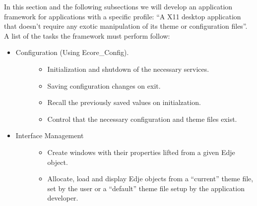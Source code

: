 \documentclass[12pt,a4paper,english]{book}
\begin{document}
In this section and the following subsections we will develop an application
framework for applications with a specific profile: ``A X11 desktop application
that doesn't require any exotic manipulation of its theme or configuration
files''. A list of the tasks the framework must perform follow:
\begin{itemize}
\item {} \begin{description}
\item[{Configuration (Using Ecore{\_}Config).}] %
\begin{itemize}
\item {} 
Initialization and shutdown of the necessary services.

\item {} 
Saving configuration changes on exit.

\item {} 
Recall the previously saved values on initialzation.

\item {} 
Control that the necessary configuration and theme files exist.

\end{itemize}

\end{description}

\item {} \begin{description}
\item[{Interface Management}] %
\begin{itemize}
\item {} 
Create windows with their properties lifted from a given Edje object.

\item {} 
Allocate, load and display Edje objects from a ``current'' theme file, set
by the user or a ``default'' theme file setup by the application developer.

\end{itemize}

\end{description}

\end{itemize}
\end{document}
